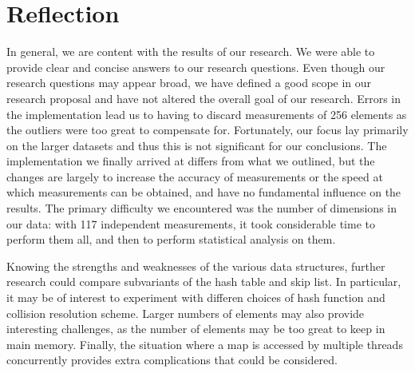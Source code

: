 \documentclass[12pt,a4paper]{article}
\begin{document}
    \section{Reflection}
    In general, we are content with the results of our research. We were able to provide clear and
    concise answers to our research questions. Even though our research questions may appear broad,
    we have defined a good scope in our research proposal and have not altered the overall goal
    of our research.  Errors in the implementation lead us to having to discard measurements of 256
    elements as the outliers were too great to compensate for.  Fortunately, our focus lay primarily
    on the larger datasets and thus this is not significant for our conclusions.  The implementation
    we finally arrived at differs from what we outlined, but the changes are largely to increase the
    accuracy of measurements or the speed at which measurements can be obtained, and have no
    fundamental influence on the results.  The primary difficulty we encountered was the number of
    dimensions in our data: with 117 independent measurements, it took considerable time to perform
    them all, and then to perform statistical analysis on them.

    Knowing the strengths and weaknesses of the various data structures, further research could
    compare subvariants of the hash table and skip list.  In particular, it may be of interest to
    experiment with differen choices of hash function and collision resolution scheme.  Larger
    numbers of elements may also provide interesting challenges, as the number of elements may be
    too great to keep in main memory.  Finally, the situation where a map is accessed by multiple
    threads concurrently provides extra complications that could be considered.

    

    
\end{document}
